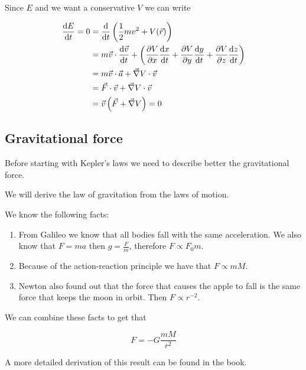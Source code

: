 \documentclass[10pt]{extarticle}
\begin{document}
Since $E$ and we want a conservative $V$ we can write

\begin{align*}
    \dv{E}{t} = 0 & = \dv{t} \left( \frac{1}{2} m v^2 + V(\vec{r}) \right)                                                              \\
                  & = m \vec{v} \cdot \dv{\vec{v}}{t} + \left(\pdv{V}{x} \dv{x}{t} + \pdv{V}{y} \dv{y}{t} + \pdv{V}{z} \dv{z}{t}\right) \\
                  & = m \vec{v} \cdot \vec{a} + \vec{\nabla} V \cdot \vec{v}                                                            \\
                  & = \vec{F} \cdot \vec{v} + \vec{\nabla} V \cdot \vec{v}                                                              \\
                  & = \vec{v}\left(\vec{F} + \vec{\nabla} V\right) = 0                                                                  \\
\end{align*}

\subsection{Gravitational force}

Before starting with Kepler's laws we need to describe better the gravitational force.

We will derive the law of gravitation from the laws of motion.

We know the following facts:

\begin{enumerate}
    \item From Galileo we know that all bodies fall with the same acceleration.
          We also know that $F = ma$ then $g = \frac{F}{m}$, therefore $F \propto F_0 m$.
    \item Because of the action-reaction principle we have that $F \propto m M$.
    \item Newton also found out that the force that causes the apple to fall is the same force that keeps the moon in orbit.
          Then $F \propto r^{-2}$.
\end{enumerate}

We can combine these facts to get that

$$
    F = - G \frac{m M}{r^2}
$$

A more detailed derivation of this result can be found in the book.
\end{document}
